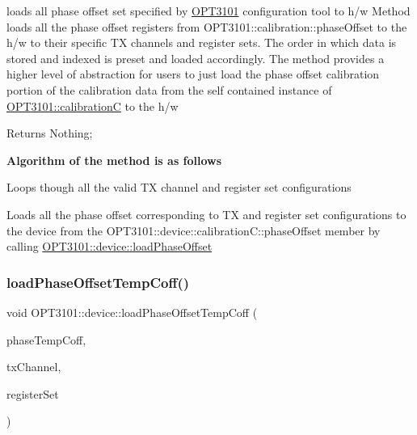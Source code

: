 loads all phase offset set specified by \mbox{\hyperlink{namespace_o_p_t3101}{O\+P\+T3101}} configuration tool to h/w Method loads all the phase offset registers from O\+P\+T3101\+::calibration\+::phase\+Offset to the h/w to their specific TX channels and register sets. The order in which data is stored and indexed is preset and loaded accordingly. The method provides a higher level of abstraction for users to just load the phase offset calibration portion of the calibration data from the self contained instance of \mbox{\hyperlink{class_o_p_t3101_1_1calibration_c}{O\+P\+T3101\+::calibrationC}} to the h/w 

\begin{DoxyReturn}{Returns}
Nothing; 
\end{DoxyReturn}
{\bfseries Algorithm of the method is as follows}


\begin{DoxyItemize}
\item Loops though all the valid TX channel and register set configurations
\item Loads all the phase offset corresponding to TX and register set configurations to the device from the O\+P\+T3101\+::device\+::calibration\+C\+::phase\+Offset member by calling \mbox{\hyperlink{class_o_p_t3101_1_1device_a941591aefa8b4c9b7436ac8f216938ed}{O\+P\+T3101\+::device\+::load\+Phase\+Offset}} 
\end{DoxyItemize}\mbox{\label{class_o_p_t3101_1_1device_a71e7ec6f26d54ea7cba11bf1c4132489}} 
\subsubsection{\texorpdfstring{load\+Phase\+Offset\+Temp\+Coff()}{loadPhaseOffsetTempCoff()}}
{\footnotesize\ttfamily void O\+P\+T3101\+::device\+::load\+Phase\+Offset\+Temp\+Coff (\begin{DoxyParamCaption}\item[{\mbox{\hyperlink{class_o_p_t3101_1_1phase_temp_coff_c}{O\+P\+T3101\+::phase\+Temp\+CoffC}} $\ast$}]{phase\+Temp\+Coff,  }\item[{uint8\+\_\+t}]{tx\+Channel,  }\item[{char}]{register\+Set }\end{DoxyParamCaption})}



